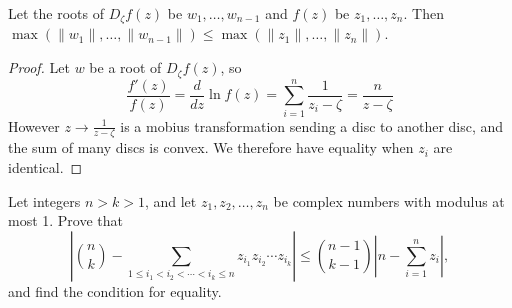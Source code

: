 \documentclass[11pt]{scrartcl}
\theoremstyle{plain} %
\theoremstyle{definition}
\theoremstyle{remark}
\theoremstyle{empty}
\theoremstyle{empty}
\theoremstyle{empty}
\theoremstyle{empty}
\theoremstyle{empty}
\theoremstyle{empty}
\theoremstyle{empty}
\begin{document}
\begin{proposition}
  Let the roots of $D_\zeta f(z)$ be $w_1, \ldots, w_{n-1}$ and $f(z)$ be $z_1, \ldots, z_n$. Then $\max(\|w_1\|, \ldots, \|w_{n-1}\|) \le \max(\|z_1\|, \ldots, \|z_n\|)$.
\end{proposition}

\begin{proof}
    Let $w$ be a root of $D_\zeta f(z)$, so \[\frac{f'(z)}{f(z)} = \frac{d}{dz} \ln f(z) =\sum_{i=1}^n \frac{1}{z_i-\zeta}= \frac{n}{z-\zeta}\] However $z \to \frac{1}{z-\zeta}$ is a mobius transformation sending a disc to another disc, and the sum of many discs is convex. We therefore have equality when $z_i$ are identical. 
\end{proof}

\begin{problem}[2026 CTST 3]
  Let integers \(n > k > 1\), and let \(z_1, z_2, \ldots, z_n\) be complex numbers with modulus at most 1. Prove that
\[
\left| \binom{n}{k}  - \sum_{1 \le i_1 < i_2 < \cdots < i_k \le n} z_{i_1} z_{i_2} \cdots z_{i_k} \right| \le \binom{n-1}{k-1}  \left| n - \sum_{i=1}^n z_i \right|,
\]and find the condition for equality.
\end{problem}
\end{document}
